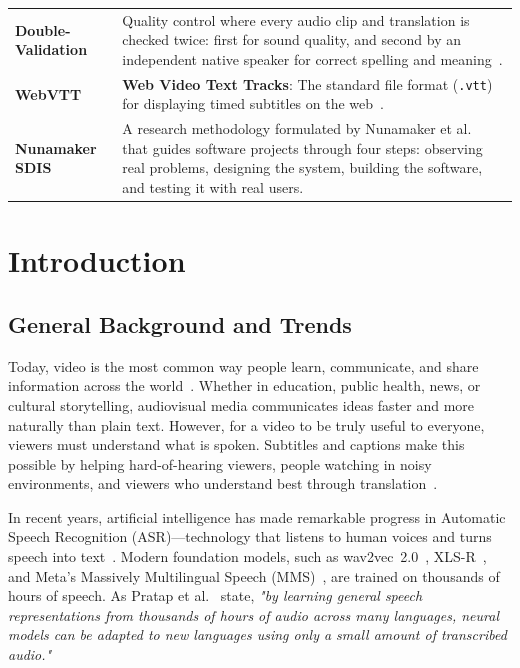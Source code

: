 \documentclass[a4paper,11pt]{article}
\begin{document}
\begin{table}[h!]
\begin{tabular}{p{3.0cm} p{14.5cm}}
\addlinespace
\textbf{Double-Validation} & Quality control where every audio clip and translation is checked twice: first for sound quality, and second by an independent native speaker for correct spelling and meaning~\cite{bird2014coscab}. \\
\addlinespace
\textbf{WebVTT} & \textbf{Web Video Text Tracks}: The standard file format (\texttt{.vtt}) for displaying timed subtitles on the web~\cite{w3c2019webvtt}. \\
\addlinespace
\textbf{Nunamaker SDIS} & A research methodology formulated by Nunamaker et al.~\cite{nunamaker1990systems} that guides software projects through four steps: observing real problems, designing the system, building the software, and testing it with real users. \\
\bottomrule
\end{tabular}
\end{table}

\mainmatter

\section{Introduction}
\label{sec:intro}

\subsection{General Background and Trends}
\label{sec:intro:background}

Today, video is the most common way people learn, communicate, and share information across the world~\cite{mayer2020multimedia}. Whether in education, public health, news, or cultural storytelling, audiovisual media communicates ideas faster and more naturally than plain text. However, for a video to be truly useful to everyone, viewers must understand what is spoken. Subtitles and captions make this possible by helping hard-of-hearing viewers, people watching in noisy environments, and viewers who understand best through translation~\cite{vaswani2017attention, radford2023robust}.

In recent years, artificial intelligence has made remarkable progress in Automatic Speech Recognition (ASR)—technology that listens to human voices and turns speech into text~\cite{amodei2016deep, dong2018speech}. Modern foundation models, such as wav2vec~2.0~\cite{baevski2020wav2vec}, XLS-R~\cite{babu2022xlsr}, and Meta's Massively Multilingual Speech (MMS)~\cite{pratap2024scaling}, are trained on thousands of hours of speech. As Pratap et al.~\cite{pratap2024scaling} state, \textit{"by learning general speech representations from thousands of hours of audio across many languages, neural models can be adapted to new languages using only a small amount of transcribed audio."}
\end{document}
